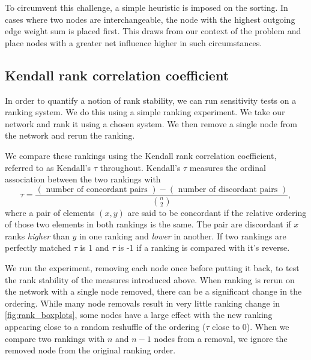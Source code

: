 To circumvent this challenge, a simple heuristic is imposed on the sorting. In cases where two nodes are interchangeable, the node with the highest outgoing edge weight sum is placed first. This draws from our context of the problem and place nodes with a greater net influence higher in such circumstances.

\subsection{Kendall rank correlation coefficient}

In order to quantify a notion of rank stability, we can run sensitivity tests on a ranking system. We do this using a simple ranking experiment. We take our network and rank it using a chosen system. We then remove a single node from the network and rerun the ranking. 

We compare these rankings using the Kendall rank correlation coefficient, referred to as Kendall's $\tau$ throughout. Kendall's $\tau$ measures the ordinal association between the two rankings with
\begin{equation}
\tau=\frac{(\text { number of concordant pairs })-(\text { number of discordant pairs })}{\binom{n}{2}},
\end{equation}
where a pair of elements $(x,y)$ are said to be concordant if the relative ordering of those two elements in both rankings is the same. The pair are discordant if $x$ ranks \emph{higher} than $y$ in one ranking and \emph{lower} in another.
If two rankings are perfectly matched $\tau$ is 1 and $\tau$ is -1 if a ranking is compared with it's reverse. 

We run the experiment, removing each node once before putting it back, to test the rank stability of the measures introduced above. When ranking is rerun on the network with a single node removed, there can be a significant change in the ordering. While many node removals result in very little ranking change in \autoref{fig:rank_boxplots}, some nodes have a large effect with the new ranking appearing close to a random reshuffle of the ordering ($\tau$ close to 0). When we compare two rankings with $n$ and $n-1$ nodes from a removal, we ignore the removed node from the original ranking order.

